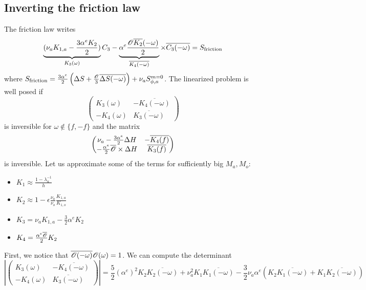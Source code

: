 \subsection{Inverting the friction law}
The friction law writes
\begin{equation}
	\underbrace{(\nu_a K_{1,a} - \frac{3\alpha^e K_{2}}{2})}_{
		K_3(\omega)
	}{C}_3
	-\underbrace{
		\alpha^e \frac{{\cal O} \overline{K_2}(-\omega)}{2}}_{
		\overline{K_4(-\omega)}}
	\times \overline{{C}_3(-\omega)}
	= S_{\rm friction}
\end{equation}
where $S_{\rm friction} =
	\frac{3\alpha^e}{2} \left(
	\Delta S + \frac{\cal O}{3}
	\overline{\Delta S(-\omega)}\right)
	+\nu_a S_{\phi,a}^{m=0}$.
The linearized problem is well posed if
\begin{equation}
	\label{eq:OASchwarz_appendix_matrix_omega}
	\begin{pmatrix}
		K_3(\omega)& - \overline{K_4(-\omega)}\\
		-K_4(\omega) & \overline{K_3(-\omega)}
	\end{pmatrix}
\end{equation}
is inversible for $\omega \notin \{f, -f\}$ and
the matrix
\begin{equation}
	\label{eq:OASchwarz_appendix_matrix_f}
	\begin{pmatrix}
		\nu_a - \frac{3 \alpha^e}{2}\Delta H &
		-\overline{K_4(f)} \\
		-\frac{\alpha^e}{2}\overline{\cal O} \times \Delta H&
		\overline{K_3(f)}
	\end{pmatrix}
\end{equation}
is inversible.
Let us approximate some of the terms for sufficiently big $M_a, M_o$:
\begin{itemize}
	\item $K_1 \approx \frac{1 - \lambda_u^{-1}}{h}$
	\item $K_2 \approx 1 - \epsilon\frac{\nu_a}{\nu_o}
		\frac{K_{1,a}}{K_{1,o}}$
	\item $K_3 = \nu_a K_{1,a} - \frac{3}{2} \alpha^e K_2$
	\item $K_4 = \frac{\alpha^e \overline{{\cal O}}}
		{2}K_2$
\end{itemize}
First, we notice that $\overline{ {\cal O}(-\omega)}
	{\cal O}(\omega) = 1$.
We can compute the determinant
\begin{equation}
\left|
\begin{pmatrix}
	K_3(\omega)& - \overline{K_4(-\omega)}\\
	-K_4(\omega) & \overline{K_3(-\omega)}
\end{pmatrix}\right|=
\frac{5}{2} (\alpha^e)^2 K_2 \overline{K_2(-\omega)}
+ \nu_a^2 K_1 \overline{K_1(-\omega)}
- \frac{3}{2} \nu_a \alpha^e \left(K_2 \overline{K_1(-\omega)}
+ K_1 \overline{K_2(-\omega)}
\right)
\end{equation}
